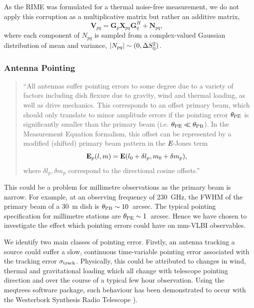 As the RIME was formulated for a thermal noise-free measurement, we do not apply this corruption as a multiplicative matrix but rather an additive matrix,
\begin{equation}\label{eq:noise_matrix}
\bm{V}_{pq} = \bm G_p \bm{X}_{pq} \bm G_q^H + \bm N_{pq},
\end{equation}
where each component of $N_{pq}$ is sampled from a complex-valued Gaussian distribution of mean and variance, $|N_{pq}| \sim (0, \Delta S_{\rm ij}^2)$.


\subsubsection{Antenna Pointing}

\begin{quotation}
``All antennas suffer pointing errors to some degree due to a variety of factors including dish flexure due to gravity, wind and thermal loading, as well as drive mechanics. This corresponds to an offset primary beam, which should only translate to minor amplitude errors if the pointing error $\theta_{\rm PE}$ is significantly smaller than the primary beam (i.e. $\theta_{\rm PE} \ll \theta_{\rm PB}$). In the Measurement Equation formalism, this offset can be represented by a modified (shifted) primary beam pattern in the {\bf \it E}-Jones term \citep[see][]{Smirnov_2011a}
\begin{equation}
{\bf E}_p(l,m) = {\bf E}(l_0 + \delta l_p, m_0 + \delta m_p),
\end{equation}
where $\delta l_p, \delta m_p$ correspond to the directional cosine offsets.''\\
\citep{Blecher_2016}
\end{quotation}

This could be a problem for millimetre observations as the primary beam is narrow. For example, at an observing frequency of 230~GHz, the FWHM of the primary beam of a 30~m dish is $\theta_{\rm PB} \sim 10$~arcsec. The typical pointing specification for millimetre stations are $\theta_{\rm PE} \sim 1$~arcsec. Hence we have chosen to investigate the effect which pointing errors could have on mm-VLBI observables. 


We identify two main classes of pointing error. Firstly, an antenna tracking a source could suffer a slow, continuous time-variable pointing error associated with the tracking error $\sigma_{\rm track}$. Physically, this could be attributed to changes in wind, thermal and gravitational loading which all change with telescope pointing direction and over the course of a typical few hour observation. Using the {\sc meqtrees} software package, such behaviour has been demonstrated to occur with the Westerbork Synthesis Radio Telescope \citep[WSRT,]{Smirnov_Calim_2011,Smirnov_2011c}).


